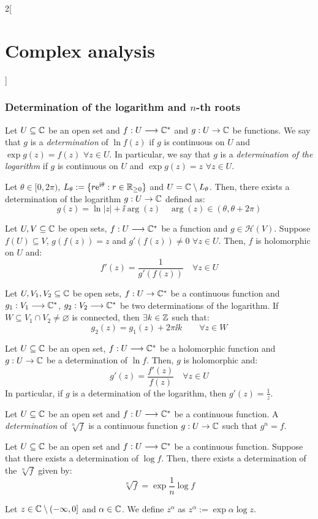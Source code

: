 \documentclass[../../../main_math.tex]{subfiles}
\begin{document}
\begin{multicols}{2}[\section{Complex analysis}]
  \subsubsection{Determination of the logarithm and \texorpdfstring{$n$}{n}-th roots}
  \begin{definition}
    Let $U\subseteq\mathbb{C}$ be an open set and $f:U\longrightarrow\mathbb{C}^*$ and $g:U\rightarrow\mathbb{C}$ be functions. We say that $g$ is a \emph{determination} of $\ln f(z)$ if $g$ is continuous on $U$ and $\exp{g(z)}=f(z)$ $\forall z\in U$. In particular, we say that $g$ is a \emph{determination of the logarithm} if $g$ is continuous on $U$ and $\exp{g(z)}=z$ $\forall z\in U$.
  \end{definition}
  \begin{proposition}
    Let $\theta\in[0,2\pi)$, $L_\theta:=\{r\mathrm{e}^{\mathrm{i}\theta}:r\in\mathbb{R}_{\geq 0}\}$ and $U=\mathbb{C}\setminus L_\theta$. Then, there exists a determination of the logarithm $g:U\rightarrow\mathbb{C}$ defined as:
    $$g(z)=\ln |z|+\ii\arg(z)\quad\arg(z)\in(\theta,\theta+2\pi)$$
  \end{proposition}
  \begin{theorem}
    Let $U,V\subseteq\mathbb{C}$ be open sets, $f:U\longrightarrow\mathbb{C}^*$ be a function and $g\in\mathcal{H}(V)$. Suppose $f(U)\subseteq V$, $g(f(z))=z$ and $g'(f(z))\ne 0$ $\forall z\in U$. Then, $f$ is holomorphic on $U$ and: $$f'(z)=\frac{1}{g'(f(z))}\quad\forall z\in U$$
  \end{theorem}
  \begin{proposition}
    Let $U,V_1,V_2\subseteq\mathbb{C}$ be open sets, $f:U\rightarrow\mathbb{C}^*$ be a continuous function and $g_1:V_1\longrightarrow\mathbb{C}^*$, $g_2:V_2\longrightarrow\mathbb{C}^*$ be two determinations of the logarithm. If $W\subseteq V_1\cap V_2\ne\varnothing$ is connected, then $\exists k\in\mathbb{Z}$ such that: $$g_2(z)=g_1(z)+2\pi \ii k\qquad\forall z\in W$$
  \end{proposition}
  \begin{corollary}
    Let $U\subseteq\mathbb{C}$ be an open set, $f:U\longrightarrow\mathbb{C}^*$ be a holomorphic function and $g:U\rightarrow\mathbb{C}$ be a determination of $\ln f$. Then, $g$ is holomorphic and: $$g'(z)=\frac{f'(z)}{f(z)}\quad \forall z\in U$$
    In particular, if $g$ is a determination of the logarithm, then $g'(z)=\frac{1}{z}$.
  \end{corollary}
  \begin{definition}
    Let $U\subseteq\mathbb{C}$ be an open set and $f:U\longrightarrow\mathbb{C}^*$ be a continuous function. A \emph{determination} of $\sqrt[n]{f}$ is a continuous function $g:U\rightarrow\mathbb{C}$ such that $g^n=f$.
  \end{definition}
  \begin{proposition}
    Let $U\subseteq\mathbb{C}$ be an open set and $f:U\longrightarrow\mathbb{C}^*$ be a continuous function. Suppose that there exists a determination of $\log f$. Then, there exists a determination of the $\sqrt[n]{f}$ given by: $$\sqrt[n]{f}=\exp{\frac{1}{n}\log f}$$
  \end{proposition}
  \begin{definition}
    Let $z\in\mathbb{C}\setminus(-\infty,0]$ and $\alpha\in\mathbb{C}$. We define $z^\alpha$ as $z^\alpha:=\exp{\alpha\log z}$.
  \end{definition}

\end{multicols}
\end{document}
